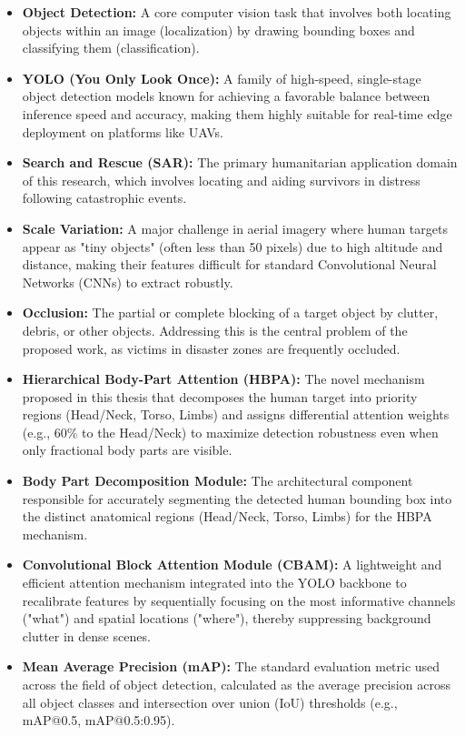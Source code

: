 \documentclass[12pt, a4paper]{report}
\begin{document}
\begin{itemize}
    \item \textbf{Object Detection:} A core computer vision task that involves both locating objects within an image (localization) by drawing bounding boxes and classifying them (classification).
    \item \textbf{YOLO (You Only Look Once):} A family of high-speed, single-stage object detection models known for achieving a favorable balance between inference speed and accuracy, making them highly suitable for real-time edge deployment on platforms like UAVs.
    \item \textbf{Search and Rescue (SAR):} The primary humanitarian application domain of this research, which involves locating and aiding survivors in distress following catastrophic events.
    \item \textbf{Scale Variation:} A major challenge in aerial imagery where human targets appear as "tiny objects" (often less than 50 pixels) due to high altitude and distance, making their features difficult for standard Convolutional Neural Networks (CNNs) to extract robustly.
    \item \textbf{Occlusion:} The partial or complete blocking of a target object by clutter, debris, or other objects. Addressing this is the central problem of the proposed work, as victims in disaster zones are frequently occluded.
    \item \textbf{Hierarchical Body-Part Attention (HBPA):} The novel mechanism proposed in this thesis that decomposes the human target into priority regions (Head/Neck, Torso, Limbs) and assigns differential attention weights (e.g., 60\% to the Head/Neck) to maximize detection robustness even when only fractional body parts are visible.
    \item \textbf{Body Part Decomposition Module:} The architectural component responsible for accurately segmenting the detected human bounding box into the distinct anatomical regions (Head/Neck, Torso, Limbs) for the HBPA mechanism.
    \item \textbf{Convolutional Block Attention Module (CBAM):} A lightweight and efficient attention mechanism integrated into the YOLO backbone to recalibrate features by sequentially focusing on the most informative channels ("what") and spatial locations ("where"), thereby suppressing background clutter in dense scenes.
    \item \textbf{Mean Average Precision (mAP):} The standard evaluation metric used across the field of object detection, calculated as the average precision across all object classes and intersection over union (IoU) thresholds (e.g., mAP@0.5, mAP@0.5:0.95).
\end{itemize}
\end{document}
